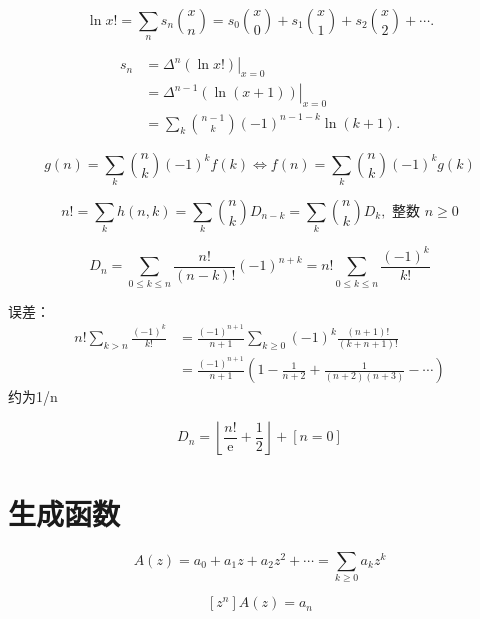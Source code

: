 \begin{equation}
    \ln x !=\sum_{n} s_{n}{x \choose n}=s_{0}{x \choose 0}+s_{1}{x \choose 1}+s_{2}{x \choose 2}+\cdots .
\end{equation}

\begin{align*}
    s_{n} &=\left.\Delta^{n}(\ln x !)\right|_{x=0} \\
        &=\left.\Delta^{n-1}(\ln (x+1))\right|_{x=0} \\
        &=\sum_{k}{n-1 \choose k}(-1)^{n-1-k} \ln (k+1) .
\end{align*}

\begin{equation}
    g(n)=\sum_{k}{n \choose k}(-1)^{k} f(k) \Leftrightarrow f(n)=\sum_{k}{n \choose k}(-1)^{k} g(k)
\end{equation}

\begin{equation}
    n !=\sum_{k} h(n, k)=\sum_{k}{n \choose k}D_{n-k}=\sum_{k}{n \choose k} D_{k}, \text { 整数 } n \geqslant 0
\end{equation}

\begin{equation}
    D_{n}=\sum_{0 \leqslant k \leqslant n} \frac{n !}{(n-k) !}(-1)^{n+k}=n ! \sum_{0 \leqslant k \leqslant n} \frac{(-1)^{k}}{k !}
\end{equation}

误差：
\begin{align*}
    n ! \sum_{k>n} \frac{(-1)^{k}}{k !} &=\frac{(-1)^{n+1}}{n+1} \sum_{k \geqslant 0}(-1)^{k} \frac{(n+1) !}{(k+n+1) !} \\
    &=\frac{(-1)^{n+1}}{n+1}\left(1-\frac{1}{n+2}+\frac{1}{(n+2)(n+3)}-\cdots\right)
\end{align*}
约为1/n

\begin{equation}
    D_{n}=\left\lfloor\frac{n !}{\mathrm{e}}+\frac{1}{2}\right\rfloor+[n=0]
\end{equation}

\section{生成函数}
\begin{equation}
    A(z)=a_{0}+a_{1} z+a_{2} z^{2}+\cdots=\sum_{k \geqslant 0} a_{k} z^{k}
\end{equation}

\begin{equation}
    \left[z^{n}\right] A(z)=a_{n}
\end{equation}

